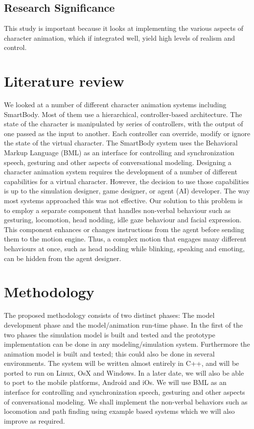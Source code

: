 \documentclass[options]{article}
\begin{document}
\subsection{\textbf{Research Significance}}
This study is important because it looks at implementing the various aspects of character animation, which if integrated well, yield high levels of realism and control.



\section{\textbf{Literature review}}
We looked at a number of different character animation systems including \cite{latexGuide}SmartBody. Most of them use a hierarchical, controller-based architecture. The state of the character is manipulated by series of controllers, with the output of one passed as the input to another. Each controller can override, modify or ignore the state of the virtual character. The SmartBody system uses the Behavioral Markup Language (BML) as an interface for controlling and synchronization speech, gesturing and other aspects of conversational modeling. \bigbreak
Designing a character animation system requires the development of a number of different capabilities for a virtual character. However, the decision to use those capabilities is up to the simulation designer, game designer, or agent (AI) developer. The way most systems approached this was not effective.\bigbreak
Our solution to this problem is to employ a separate component that handles non-verbal behaviour such as gesturing, \cite{latexMath}locomotion,  head nodding, idle gaze behaviour and facial expression. This component enhances or changes instructions from the agent before sending them to the motion engine. Thus, a complex motion that engages many different behaviours at once, such as head nodding while blinking, speaking and emoting, can be hidden from the agent designer.



\section{\textbf{Methodology}}
The proposed methodology consists of two distinct phases: The model development phase and the model/animation run-time phase. In the first of the two phases the simulation model is built and tested and the prototype implementation can be done in any modeling/simulation system. Furthermore the animation model is built and tested; this could also be done in several environments. \bigbreak
The system will be written almost entirely in C++, and will be ported to run on Linux, OsX and Windows. In a later date, we will also be able to port to the mobile platforms, Android and iOs.\bigbreak
We will use BML as an interface for controlling and synchronization speech, gesturing and other aspects of conversational modeling.
We shall implement the non-verbal behaviors such as locomotion and path finding using example based systems which we will also improve as required.
\end{document}
